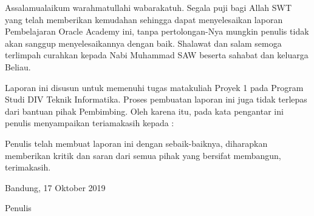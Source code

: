 \begin{acknowledgements}
Assalamualaikum warahmatullahi wabarakatuh. Segala puji bagi Allah SWT yang telah memberikan kemudahan sehingga dapat menyelesaikan laporan Pembelajaran Oracle Academy ini, tanpa pertolongan-Nya mungkin penulis tidak akan sanggup menyelesaikannya dengan baik. Shalawat dan salam semoga terlimpah curahkan kepada Nabi Muhammad SAW beserta sahabat dan keluarga Beliau.

Laporan ini disusun untuk memenuhi tugas matakuliah Proyek 1 pada Program Studi DIV Teknik Informatika. Proses pembuatan laporan ini juga tidak terlepas dari bantuan pihak Pembimbing. Oleh karena itu, pada kata pengantar ini penulis menyampaikan teriamakasih kepada :

Penulis telah membuat laporan ini dengan sebaik-baiknya, diharapkan memberikan kritik dan saran dari semua pihak yang bersifat membangun, terimakasih.

\begin{raggedleft}

Bandung, 17 Oktober 2019

Penulis

\end{raggedleft}

\end{acknowledgements}